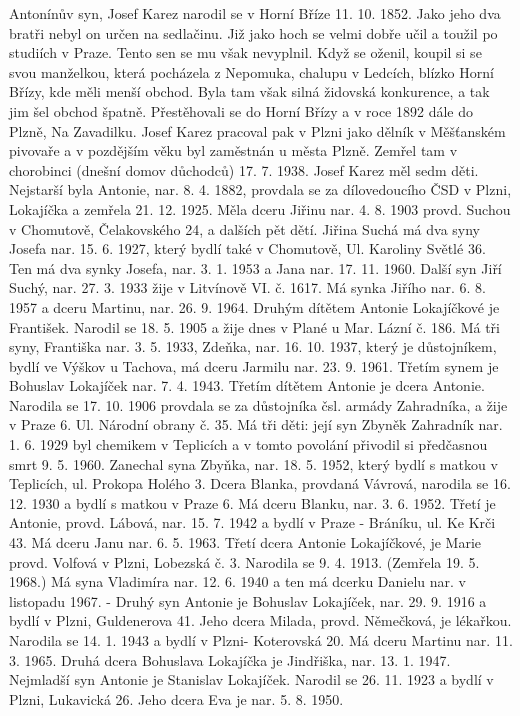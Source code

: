 \documentclass[../dejiny-rodu-prusiku.tex]{subfiles}
\begin{document}
Antonínův syn, Josef Karez narodil se v Horní Bříze 11. 10. 1852. Jako jeho dva bratři nebyl on určen na sedlačinu. Již jako hoch se velmi dobře učil a toužil po stu­diích v Praze. Tento sen se mu však nevyplnil. Když se oženil, koupil si se svou manželkou, která pocházela z Nepomuka, chalupu v Ledcích, blízko Horní Břízy, kde měli
menší obchod. Byla tam však silná židovská konkurence, a tak jim šel obchod špatně. Přestěhovali se do Hor­ní Břízy a v roce 1892 dále do Plzně, Na Zavadilku. Josef Karez pracoval pak v Plzni jako dělník v Měšťanském pivovaře a v pozdějším věku byl zaměstnán u města Plzně. Zemřel tam v chorobinci (dnešní domov důchodců) 17. 7. 1938. Josef Karez měl sedm děti. Nejstarší byla Antonie, nar. 8. 4. 1882, provdala se za dílovedoucího ČSD v Plzni, Lokajíčka a zemřela 21. 12. 1925. Měla dceru Jiřinu nar. 4. 8. 1903 provd. Suchou v Chomutově, Čelakovského 24, a dalších pět dětí. Jiřina Suchá má dva syny Josefa nar. 15. 6. 1927, který bydlí také v Chomutově, Ul. Karoliny Světlé 36. Ten má dva synky Josefa, nar. 3. 1. 1953 a Jana nar. 17. 11. 1960. Další syn Jiří Suchý, nar. 27. 3. 1933 žije v Litvínově VI. č. 1617. Má synka Jiřího nar. 6. 8. 1957 a dceru Martinu, nar. 26. 9. 1964. Druhým dítětem Antonie Lokajíčkové je František. Narodil se 18. 5. 1905 a žije dnes v Plané u Mar. Lázní č. 186. Má tři syny, Františka nar. 3. 5. 1933, Zdeňka, nar. 16. 10. 1937, který je důstojníkem, bydlí ve Výškov u Tachova, má dceru Jarmilu nar. 23. 9. 1961. Třetím synem je Bohuslav Lokajíček nar. 7. 4. 1943. Třetím dí­tětem Antonie je dcera Antonie. Narodila se 17. 10. 1906 provdala se za důstojníka čsl. armády Zahradníka, a žije v Praze 6. Ul. Národní obrany č. 35. Má tři děti: její syn Zbyněk Zahradník nar. 1. 6. 1929 byl chemikem v Teplicích a v tomto povolání přivodil si předčasnou smrt 9. 5. 1960. Zanechal syna Zbyňka, nar. 18. 5. 1952, který bydlí s mat­kou v Teplicích,  ul. Prokopa Holého 3. Dcera Blanka, provdaná Vávrová, narodila se 16. 12. 1930 a bydlí s matkou v Praze 6. Má dceru Blanku, nar. 3. 6. 1952. Třetí je Antonie, provd. Lábová, nar. 15. 7. 1942 a bydlí v Praze - Bráníku, ul. Ke Krči 43. Má dceru Janu nar. 6. 5. 1963. Třetí dcera Antonie Lokajíčkové, je Marie provd. Volfová v Plzni, Lobezská č. 3. Narodila se 9. 4. 1913. (Zemřela 19. 5. 1968.) Má syna Vladi­míra nar. 12. 6. 1940 a ten má dcerku Danielu nar. v listopadu 1967. - Druhý syn Antonie je Bohuslav Lokajíček, nar. 29. 9. 1916 a bydlí v Plzni, Guldenerova 41. Jeho dcera Milada, provd. Němečková, je lékařkou. Narodila se 14. 1. 1943 a bydlí v Plzni- Koterovská 20. Má dceru Marti­nu nar. 11. 3. 1965. Druhá dcera Bohuslava Lokajíčka je Jindřiška, nar. 13. 1. 1947. Nejmladší syn Antonie je Sta­nislav Lokajíček. Narodil se 26. 11. 1923 a bydlí v Plzni, Lukavická 26. Jeho dcera Eva je nar. 5. 8. 1950.
\end{document}
